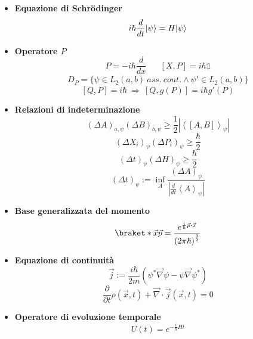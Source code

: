 \documentclass{article}
\DeclarePairedDelimiter\ket{\lvert}{\rangle}
\begin{document}
\begin{footnotesize}
\begin{multicols*}{3}
\begin{itemize}[leftmargin=*]
	\item \textbf{Equazione di Schr\"{o}dinger}
		\[i\hbar \frac{d}{dt} \ket{\psi } = H\ket{\psi }\]
	\item \textbf{Operatore $P$}
		\[P=-i\hbar \frac{d}{dx}%
		\hspace{20pt} \left[X,P\right] = i\hbar \mathds{1}\]
		\begin{align*}
			D_P = \{\psi \in L_2(a,b)\ ass.\ cont.  \land    \psi'\in L_2(a,b)\}
		\end{align*}
		\[\left[Q,P\right] = i\hbar \ \Rightarrow \ \left[Q,g(P)\right] = i\hbar g'(P)\]
	\item \textbf{Relazioni di indeterminazione}
		\[\left(\Delta A\right)_{a,\psi }\left(\Delta  B\right)_{b,\psi } \geq  \frac{1}{2} \left|\left<\left[A,B\right]\right>_{\psi }\right|\]
		\[\left(\Delta X_i\right)_\psi \left(\Delta P_i\right)_\psi \geq  \frac{\hbar }{2}\]
		\[\left(\Delta t\right)_\psi \left(\Delta H\right)_\psi \geq  \frac{\hbar }{2}\]
		\[\left(\Delta t\right)_\psi := \inf_A \frac{\left(\Delta A\right)_\psi }{\left|\frac{d}{dt} \left< A\right>_\psi \right|}\]
	\item \textbf{Base generalizzata del momento}
		\[\braket*{\vec{x}}{\vec{p}} = \frac{e^{\frac{i}{\hbar }\vec{p}\cdot \vec{x}}}{\left(2\pi \hbar \right)^{\frac{3}{2}}}\]
	\item \textbf{Equazione di continuità}
		\[\vec{j}:= \frac{i\hbar }{2m} \left(\psi ^* \vec{\nabla }\psi  - \psi \vec{\nabla }\psi ^*\right)\]
		\[\frac{\partial}{\partial t}\rho \left(\vec{x},t\right) + \vec{\nabla} \cdot \vec{j}\left(\vec{x},t\right)=0\]
	\item \textbf{Operatore di evoluzione temporale}
		\[U\left(t\right) = e^{-\frac{i}{\hbar } Ht}\]


\end{itemize}
\end{multicols*}
\end{footnotesize}
\end{document}
